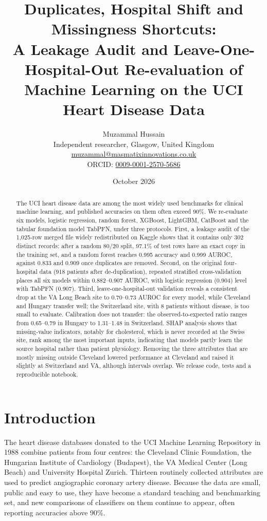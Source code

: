 \documentclass[11pt]{article}
\title{Duplicates, Hospital Shift and Missingness Shortcuts:\\
A Leakage Audit and Leave-One-Hospital-Out Re-evaluation of Machine Learning on the UCI Heart Disease Data}
\author{Muzammal Hussain\\
\small Independent researcher, Glasgow, United Kingdom\\
\small \href{mailto:muzammal@masmatixinnovations.co.uk}{muzammal@masmatixinnovations.co.uk}\\
\small ORCID: \href{https://orcid.org/0009-0001-2570-5686}{0009-0001-2570-5686}}
\date{\small October 2026}
\begin{document}
\maketitle

\begin{abstract}
The UCI heart disease data are among the most widely used benchmarks for clinical machine learning, and published accuracies on them often exceed 90\%. We re-evaluate six models, logistic regression, random forest, XGBoost, LightGBM, CatBoost and the tabular foundation model TabPFN, under three protocols. First, a leakage audit of the 1,025-row merged file widely redistributed on Kaggle shows that it contains only 302 distinct records: after a random 80/20 split, 97.1\% of test rows have an exact copy in the training set, and a random forest reaches 0.995 accuracy and 0.999 AUROC, against 0.833 and 0.909 once duplicates are removed. Second, on the original four-hospital data (918 patients after de-duplication), repeated stratified cross-validation places all six models within 0.882--0.907 AUROC, with logistic regression (0.904) level with TabPFN (0.907). Third, leave-one-hospital-out validation reveals a consistent drop at the VA Long Beach site to 0.70--0.73 AUROC for every model, while Cleveland and Hungary transfer well; the Switzerland site, with 8 patients without disease, is too small to evaluate. Calibration does not transfer: the observed-to-expected ratio ranges from 0.65--0.79 in Hungary to 1.31--1.48 in Switzerland. SHAP analysis shows that missing-value indicators, notably for cholesterol, which is never recorded at the Swiss site, rank among the most important inputs, indicating that models partly learn the source hospital rather than patient physiology. Removing the three attributes that are mostly missing outside Cleveland lowered performance at Cleveland and raised it slightly at Switzerland and VA, although intervals overlap. We release code, tests and a reproducible notebook.
\end{abstract}

\section{Introduction}
The heart disease databases donated to the UCI Machine Learning Repository in 1988 \citep{uciheart,detrano1989} combine patients from four centres: the Cleveland Clinic Foundation, the Hungarian Institute of Cardiology (Budapest), the VA Medical Center (Long Beach) and University Hospital Zurich. Thirteen routinely collected attributes are used to predict angiographic coronary artery disease. Because the data are small, public and easy to use, they have become a standard teaching and benchmarking set, and new comparisons of classifiers on them continue to appear, often reporting accuracies above 90\%.
\end{document}
